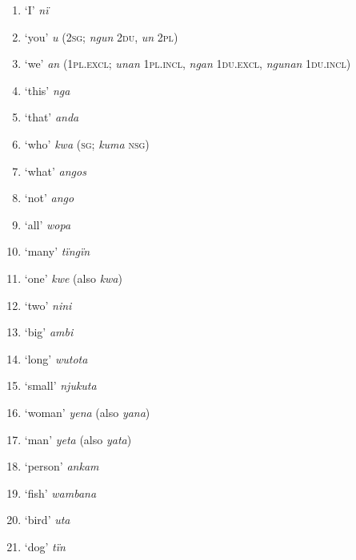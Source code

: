 \begin{enumerate}[noitemsep, label={\arabic*}, align=left, widest=190, labelsep=1ex,leftmargin=*]
\item ‘I’ \textit{nï}

\item ‘you’ \textit{u} (2\textsc{sg;} \textit{ngun} 2\textsc{du,} \textit{un} \textsc{2pl})

\item ‘we’ \textit{an} (1\textsc{pl.excl;} \textit{unan} 1\textsc{pl.incl}, \textit{ngan} 1\textsc{du.excl,} \textit{ngunan} 1\textsc{du.incl})

\item ‘this’ \textit{nga}

\item ‘that’ \textit{anda}

\item ‘who’ \textit{kwa} (\textsc{sg;} \textit{kuma} \textsc{nsg)}

\item ‘what’ \textit{angos}

\item ‘not’ \textit{ango}

\item ‘all’ \textit{wopa}

\item ‘many’ \textit{tïngïn}

\item ‘one’ \textit{kwe} (also \textit{kwa})

\item ‘two’ \textit{nini}

\item ‘big’ \textit{ambi}

\item ‘long’ \textit{wutota}

\item ‘small’ \textit{njukuta}

\item ‘woman’ \textit{yena} (also \textit{yana})

\item ‘man’ \textit{yeta} (also \textit{yata})

\item ‘person’ \textit{ankam}

\item ‘fish’ \textit{wambana}

\item ‘bird’ \textit{uta}

\item ‘dog’ \textit{tïn}


\end{enumerate}

